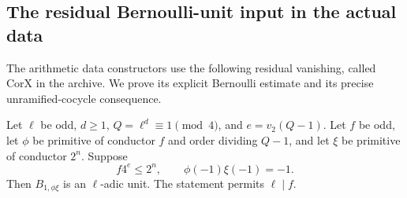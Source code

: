\subsection{The residual Bernoulli-unit input in the actual data}
\label{subsec:sr-residual-bernoulli-input}
The arithmetic data constructors use the following residual
vanishing, called \(\mathrm{CorX}\) in the archive.
We prove its explicit Bernoulli estimate and its precise
unramified-cocycle consequence.

\begin{srlemma}\label{lem:sr-dyadic-bernoulli-unit}
Let \(\ell\) be odd, \(d\ge1\),
\(Q=\ell^d\equiv1\pmod4\), and \(e=v_2(Q-1)\).
Let \(f\) be odd, let \(\phi\) be primitive of conductor
\(f\) and order dividing \(Q-1\), and let \(\xi\) be
primitive of conductor \(2^n\).
Suppose
\[
                 f4^e\le2^n,\qquad
                         \phi(-1)\xi(-1)=-1.
 \tag{BX1}
\]
Then \(B_{1,\phi\xi}\) is an \(\ell\)-adic unit.
The statement permits \(\ell\mid f\).
\end{srlemma}
